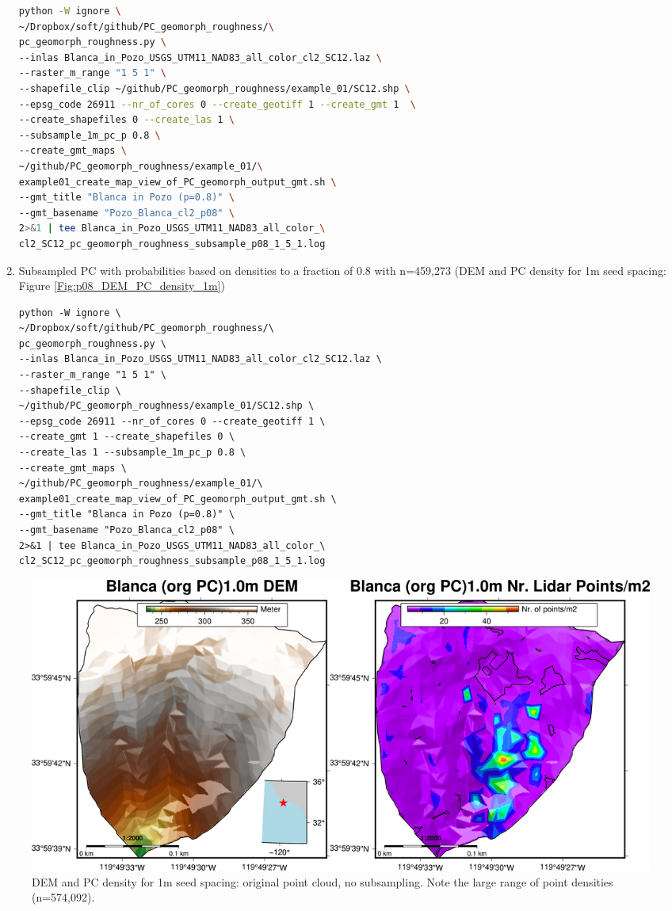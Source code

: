 \documentclass[a4paperpaper,,tablecaptionabove]{scrartcl}
\begin{document}
\begin{enumerate}
\begin{lstlisting}[language=bash]
python -W ignore \
~/Dropbox/soft/github/PC_geomorph_roughness/\
pc_geomorph_roughness.py \
--inlas Blanca_in_Pozo_USGS_UTM11_NAD83_all_color_cl2_SC12.laz \
--raster_m_range "1 5 1" \
--shapefile_clip ~/github/PC_geomorph_roughness/example_01/SC12.shp \
--epsg_code 26911 --nr_of_cores 0 --create_geotiff 1 --create_gmt 1  \
--create_shapefiles 0 --create_las 1 \
--subsample_1m_pc_p 0.8 \
--create_gmt_maps \
~/github/PC_geomorph_roughness/example_01/\
example01_create_map_view_of_PC_geomorph_output_gmt.sh \
--gmt_title "Blanca in Pozo (p=0.8)" \
--gmt_basename "Pozo_Blanca_cl2_p08" \
2>&1 | tee Blanca_in_Pozo_USGS_UTM11_NAD83_all_color_\
cl2_SC12_pc_geomorph_roughness_subsample_p08_1_5_1.log
\end{lstlisting}
\item
  Subsampled PC with probabilities based on densities to a fraction of
  0.8 with n=459,273 (DEM and PC density for 1m seed spacing: Figure
  \ref{Fig:p08_DEM_PC_density_1m})

\begin{lstlisting}
python -W ignore \
~/Dropbox/soft/github/PC_geomorph_roughness/\
pc_geomorph_roughness.py \
--inlas Blanca_in_Pozo_USGS_UTM11_NAD83_all_color_cl2_SC12.laz \
--raster_m_range "1 5 1" \
--shapefile_clip \
~/github/PC_geomorph_roughness/example_01/SC12.shp \
--epsg_code 26911 --nr_of_cores 0 --create_geotiff 1 \
--create_gmt 1 --create_shapefiles 0 \
--create_las 1 --subsample_1m_pc_p 0.8 \
--create_gmt_maps \
~/github/PC_geomorph_roughness/example_01/\
example01_create_map_view_of_PC_geomorph_output_gmt.sh \
--gmt_title "Blanca in Pozo (p=0.8)" \
--gmt_basename "Pozo_Blanca_cl2_p08" \
2>&1 | tee Blanca_in_Pozo_USGS_UTM11_NAD83_all_color_\
cl2_SC12_pc_geomorph_roughness_subsample_p08_1_5_1.log
\end{lstlisting}
\end{enumerate}

\begin{figure}
\centering
\includegraphics{./tex2pdf.-e6884bf2dada0f3b/bd1c1ac312900576d6cb8247489a52d91bd2bf21.png}
\caption{DEM and PC density for 1m seed spacing: original point cloud,
no subsampling. Note the large range of point densities (n=574,092).
\label{Fig:org_DEM_PC_density_1m}}
\end{figure}
\end{document}
